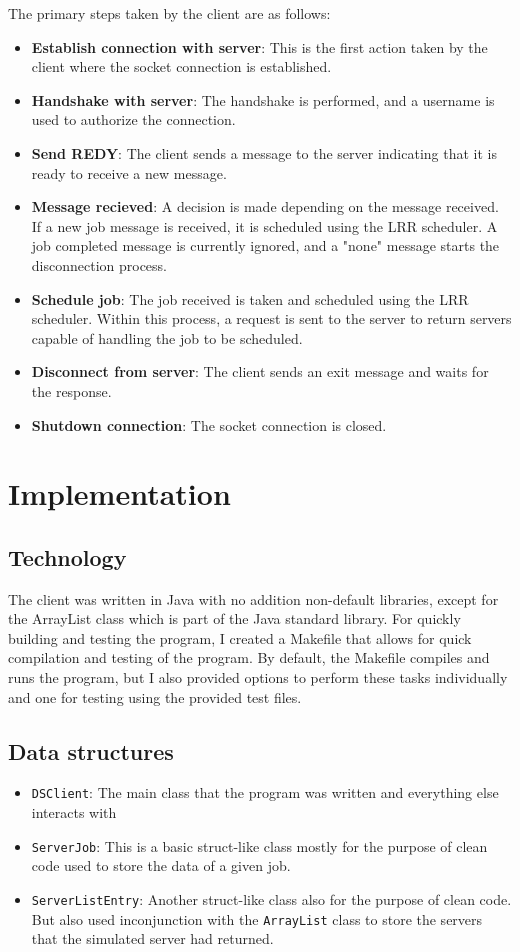 \documentclass[a4paper]{article} %
\begin{document}
The primary steps taken by the client are as follows:
\begin{itemize}
	\item \textbf{Establish connection with server}: This is the first action taken by the client where the socket connection is established.
	\item\textbf{Handshake with server}: The handshake is performed, and a username is used to authorize the connection.
	\item\textbf{Send REDY}: The client sends a message to the server indicating that it is ready to receive a new message.
	\item\textbf{Message recieved}: A decision is made depending on the message received. If a new job message is received, it is scheduled using the LRR scheduler. A job completed message is currently ignored, and a "none" message starts the disconnection process.
	\item\textbf{Schedule job}: The job received is taken and scheduled using the LRR scheduler. Within this process, a request is sent to the server to return servers capable of handling the job to be scheduled.
	\item\textbf{Disconnect from server}: The client sends an exit message and waits for the response.
	\item\textbf{Shutdown connection}: The socket connection is closed.
\end{itemize}
\section{Implementation}

\subsection{Technology}
The client was written in Java with no addition non-default libraries, except for the ArrayList class which is part of the Java standard library.
For quickly building and testing the program, I created a Makefile that allows for quick compilation and testing of the program. By default, the Makefile compiles and runs the program, but I also provided options to perform these tasks individually and one for testing using the provided test files.

\subsection{Data structures}
\begin{itemize}
	\item  \texttt{DSClient}: The main class that the program was written and everything else interacts with
	\item  \texttt{ServerJob}: This is a basic struct-like class mostly for the purpose of clean code used to store the data of a given job.
	\item  \texttt{ServerListEntry}: Another struct-like class also for the purpose of clean code. But also used inconjunction with the \texttt{ArrayList} class to store the servers that the simulated server had returned.
\end{itemize}
\end{document}
